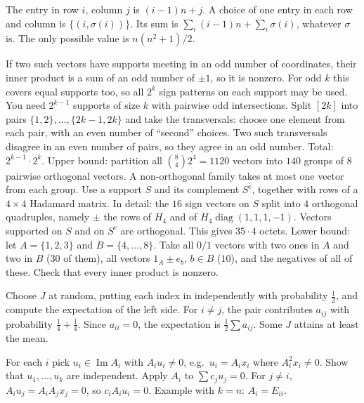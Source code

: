 \documentclass[11pt,a4paper]{article}
\begin{document}
The entry in row \(i\), column \(j\) is \((i-1)n+j\). A choice of one entry in each row and column is \(\{(i,\sigma(i))\}\). Its sum is \(\sum_i(i-1)n+\sum_i\sigma(i)\), whatever \(\sigma\) is. The only possible value is \(n(n^2+1)/2\).

If two such vectors have supports meeting in an odd number of coordinates, their inner product is a sum of an odd number of \(\pm1\), so it is nonzero. For odd \(k\) this covers equal supports too, so all \(2^k\) sign patterns on each support may be used.
You need \(2^{k-1}\) supports of size \(k\) with pairwise odd intersections. Split \([2k]\) into pairs \(\{1,2\},\dots,\{2k-1,2k\}\) and take the transversals: choose one element from each pair, with an even number of ``second'' choices. Two such transversals disagree in an even number of pairs, so they agree in an odd number. Total: \(2^{k-1}\cdot2^k\).
Upper bound: partition all \(\binom84 2^4=1120\) vectors into \(140\) groups of \(8\) pairwise orthogonal vectors. A non-orthogonal family takes at most one vector from each group. Use a support \(S\) and its complement \(S^c\), together with rows of a \(4\times4\) Hadamard matrix.
In detail: the \(16\) sign vectors on \(S\) split into \(4\) orthogonal quadruples, namely \(\pm\) the rows of \(H_4\) and of \(H_4\operatorname{diag}(1,1,1,-1)\). Vectors supported on \(S\) and on \(S^c\) are orthogonal. This gives \(35\cdot4\) octets.
Lower bound: let \(A=\{1,2,3\}\) and \(B=\{4,\dots,8\}\). Take all \(0/1\) vectors with two ones in \(A\) and two in \(B\) (\(30\) of them), all vectors \(1_A\pm e_b\), \(b\in B\) (\(10\)), and the negatives of all of these. Check that every inner product is nonzero.

Choose \(J\) at random, putting each index in independently with probability \(\frac12\), and compute the expectation of the left side.
For \(i\ne j\), the pair contributes \(a_{ij}\) with probability \(\frac14+\frac14\). Since \(a_{ii}=0\), the expectation is \(\frac12\sum a_{ij}\). Some \(J\) attains at least the mean.

For each \(i\) pick \(u_i\in\operatorname{Im}A_i\) with \(A_iu_i\ne0\), e.g.\ \(u_i=A_ix_i\) where \(A_i^2x_i\ne0\). Show that \(u_1,\dots,u_k\) are independent.
Apply \(A_i\) to \(\sum c_ju_j=0\). For \(j\ne i\), \(A_iu_j=A_iA_jx_j=0\), so \(c_iA_iu_i=0\). Example with \(k=n\): \(A_i=E_{ii}\).
\end{document}
